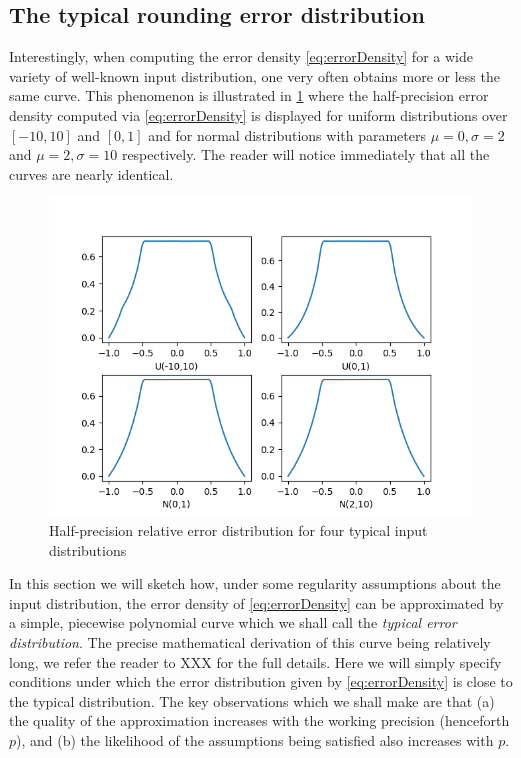 \documentclass[10pt,conference]{IEEEtran}
\begin{document}
\subsection{The typical rounding error distribution}
Interestingly, when computing the error density \cref{eq:errorDensity} for a wide variety of well-known input distribution, one very often obtains more or less the same curve. This phenomenon is illustrated in \cref{fig:errdist} where the half-precision error density computed via \cref{eq:errorDensity} is displayed for uniform distributions over $\left[-10,10\right]$ and $\left[0,1\right]$ and for normal distributions with parameters $\mu=0,\sigma=2$ and $\mu=2,\sigma=10$ respectively. The reader will notice immediately that all the curves are nearly identical.
\begin{figure}[h!]
\includegraphics[scale=0.65]{pics/several_examples}
\caption{Half-precision relative error distribution for four typical input distributions}
\label{fig:errdist}
\end{figure}
In this section we will sketch how, under some regularity assumptions about the input distribution, the error density of \cref{eq:errorDensity} can be approximated by a simple, piecewise polynomial curve which we shall call the \emph{typical error distribution}. The precise mathematical derivation of this curve being relatively long, we refer the reader to XXX for the full details. Here we will simply specify conditions under which the error distribution given by \cref{eq:errorDensity} is close to the typical distribution. The key observations which we shall make are that (a) the quality of the approximation increases with the working precision (henceforth $p$), and (b) the likelihood of the assumptions being satisfied also increases with $p$.
\end{document}
